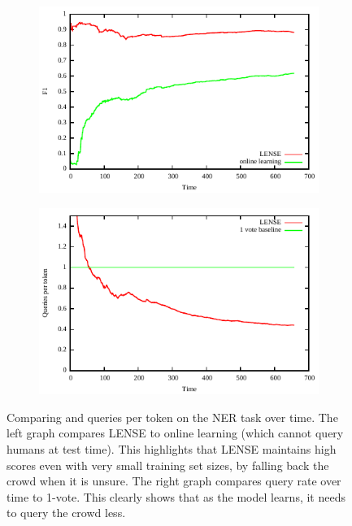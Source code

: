 \begin{figure}[t]
  \centering
  \begin{subfigure}[b]{0.49\textwidth}
  \includegraphics[width=\textwidth]{figures/ner_2_class/f1_plot/f1_vs_time.pdf}
\end{subfigure}
  \begin{subfigure}[b]{0.49\textwidth}
  \includegraphics[width=\textwidth]{figures/ner_2_class/cost_plot/cost_vs_time.pdf}
  \end{subfigure}
  \caption[Comparing \fone{} and queries per token on the NER task over time.]{\label{fig:ner-f1} Comparing \fone{} and queries per token on the NER task over time. The left graph compares LENSE to online learning (which cannot query humans at test time). This highlights that LENSE maintains high \fone{} scores even with very small training set sizes, by falling back the crowd when it is unsure. The right graph compares query rate over time to 1-vote. This clearly shows that as the model learns, it needs to query the crowd less.}

\end{figure}

